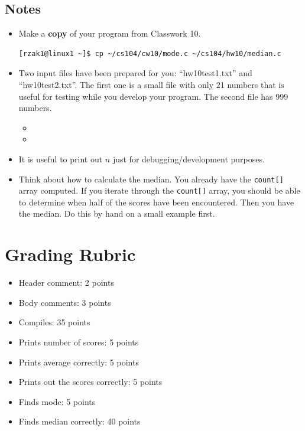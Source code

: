 \documentclass[letter,11pt]{article}
\begin{document}
\subsection*{Notes}
\begin{itemize}
    \item Make a \textbf{copy} of your program from Classwork 10.
    \begin{verbatim}
[rzak1@linux1 ~]$ cp ~/cs104/cw10/mode.c ~/cs104/hw10/median.c
    \end{verbatim}
    \item Two input files have been prepared for you: ``hw10test1.txt'' and ``hw10test2.txt''. The first one is a small file with only 21 numbers that is useful for testing while you develop your program. The second file has 999 numbers.
    \begin{itemize}
        \item {}
        \item {}
    \end{itemize}
    \item It is useful to print out $n$ just for debugging/development purposes.
    \item Think about how to calculate the median. You already have the \texttt{count[]} array computed. If you iterate through the \texttt{count[]} array, you should be able to determine when half of the scores have been encountered. Then you have the median. Do this by hand on a small example first.
\end{itemize}

\section*{Grading Rubric}
\begin{itemize}
    \item Header comment: 2 points
    \item Body comments: 3 points
    \item Compiles: 35 points
    \item Prints number of scores: 5 points
    \item Prints average correctly: 5 points
    \item Prints out the scores correctly: 5 points
    \item Finds mode: 5 points
    \item Finds median correctly: 40 points
\end{itemize}
\end{document}
